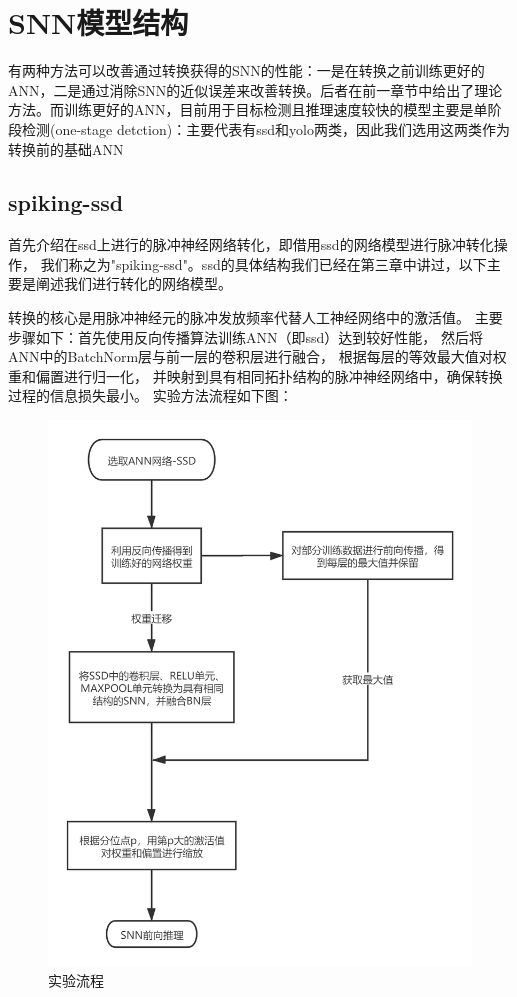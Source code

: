 \chapter{SNN模型结构}
\par
有两种方法可以改善通过转换获得的SNN的性能：一是在转换之前训练更好的ANN，二是通过消除SNN的近似误差来改善转换。后者在前一章节中给出了理论方法。而训练更好的ANN，目前用于目标检测且推理速度较快的模型主要是单阶段检测(one-stage detction)：主要代表有ssd和yolo两类，因此我们选用这两类作为转换前的基础ANN
\section{spiking-ssd}
\par
首先介绍在ssd上进行的脉冲神经网络转化，即借用ssd的网络模型进行脉冲转化操作，
我们称之为"spiking-ssd"。ssd的具体结构我们已经在第三章中讲过，以下主要是阐述我们进行转化的网络模型。
\par
转换的核心是用脉冲神经元的脉冲发放频率代替人工神经网络中的激活值。
主要步骤如下：首先使用反向传播算法训练ANN（即ssd）达到较好性能，
然后将ANN中的BatchNorm层与前一层的卷积层进行融合，
根据每层的等效最大值对权重和偏置进行归一化，
并映射到具有相同拓扑结构的脉冲神经网络中，确保转换过程的信息损失最小。
实验方法流程如下图：
\begin{figure}[H]
	\centering
	\setlength{\abovecaptionskip}{0cm}  
	\includegraphics[scale = 0.35]{figures/flowchart.png}
	\caption{实验流程}
\end{figure}
